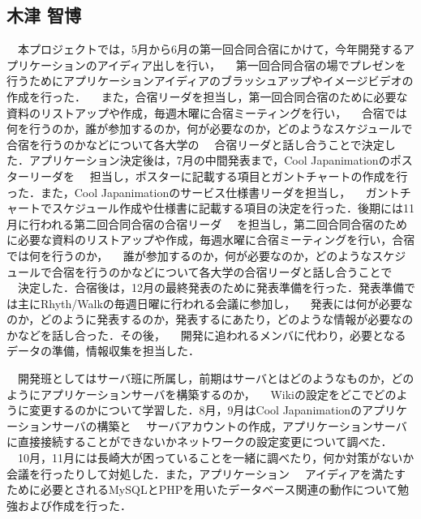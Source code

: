 \subsection{木津 智博}
\par
　本プロジェクトでは，5月から6月の第一回合同合宿にかけて，今年開発するアプリケーションのアイディア出しを行い，
　第一回合同合宿の場でプレゼンを行うためにアプリケーションアイディアのブラッシュアップやイメージビデオの作成を行った．
　また，合宿リーダを担当し，第一回合同合宿のために必要な資料のリストアップや作成，毎週木曜に合宿ミーティングを行い，
　合宿では何を行うのか，誰が参加するのか，何が必要なのか，どのようなスケジュールで合宿を行うのかなどについて各大学の
　合宿リーダと話し合うことで決定した．アプリケーション決定後は，7月の中間発表まで，Cool Japanimationのポスターリーダを
　担当し，ポスターに記載する項目とガントチャートの作成を行った．また，Cool Japanimationのサービス仕様書リーダを担当し，
　ガントチャートでスケジュール作成や仕様書に記載する項目の決定を行った．後期には11月に行われる第二回合同合宿の合宿リーダ
　を担当し，第二回合同合宿のために必要な資料のリストアップや作成，毎週水曜に合宿ミーティングを行い，合宿では何を行うのか，
　誰が参加するのか，何が必要なのか，どのようなスケジュールで合宿を行うのかなどについて各大学の合宿リーダと話し合うことで
　決定した．合宿後は，12月の最終発表のために発表準備を行った．発表準備では主にRhyth/Walkの毎週日曜に行われる会議に参加し，
　発表には何が必要なのか，どのように発表するのか，発表するにあたり，どのような情報が必要なのかなどを話し合った．その後，
　開発に追われるメンバに代わり，必要となるデータの準備，情報収集を担当した．
\par
　開発班としてはサーバ班に所属し，前期はサーバとはどのようなものか，どのようにアプリケーションサーバを構築するのか，
　Wikiの設定をどこでどのように変更するのかについて学習した．8月，9月はCool Japanimationのアプリケーションサーバの構築と
　サーバアカウントの作成，アプリケーションサーバに直接接続することができないかネットワークの設定変更について調べた．
　10月，11月には長崎大が困っていることを一緒に調べたり，何か対策がないか会議を行ったりして対処した．また，アプリケーション
　アイディアを満たすために必要とされるMySQLとPHPを用いたデータベース関連の動作について勉強および作成を行った．
\par

